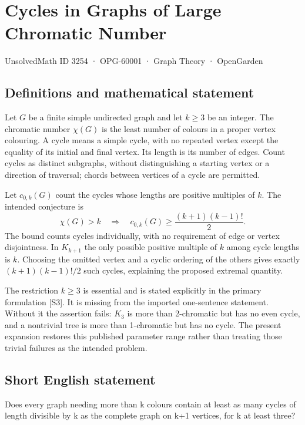 \documentclass[11pt,a4paper]{article}
\begin{document}
\section*{Cycles in Graphs of Large Chromatic Number}\label{3254}
{\small UnsolvedMath ID 3254 · OPG-60001 · Graph Theory · OpenGarden}
\subsection{Definitions and mathematical statement}
Let $G$ be a finite simple undirected graph and let $k\ge3$ be an integer.
The chromatic number $\chi(G)$ is the least number of colours in a proper
vertex colouring. A cycle means a simple cycle, with no repeated vertex
except the equality of its initial and final vertex. Its length is its
number of edges. Count cycles as distinct subgraphs, without distinguishing
a starting vertex or a direction of traversal; chords between vertices
of a cycle are permitted.

Let $c_{0,k}(G)$ count the cycles whose lengths are positive multiples of
$k$. The intended conjecture is
\[
 \chi(G)>k\quad\Longrightarrow\quad
 c_{0,k}(G)\ge\frac{(k+1)(k-1)!}{2}.
\]
The bound counts cycles individually, with no requirement of edge or
vertex disjointness. In $K_{k+1}$ the only possible positive multiple of
$k$ among cycle lengths is $k$. Choosing the omitted vertex and a cyclic
ordering of the others gives exactly $(k+1)(k-1)!/2$ such cycles, explaining
the proposed extremal quantity.

The restriction $k\ge3$ is essential and is stated explicitly in the
primary formulation [S3]. It is missing from the imported one-sentence
statement. Without it the assertion fails: $K_3$ is more than
2-chromatic but has no even cycle, and a nontrivial tree is more than
1-chromatic but has no cycle. The present expansion restores this
published parameter range rather than treating those trivial failures
as the intended problem.
\subsection{Short English statement}
Does every graph needing more than k colours contain at least as many cycles of length divisible by k as the complete graph on k+1 vertices, for k at least three?
\end{document}
